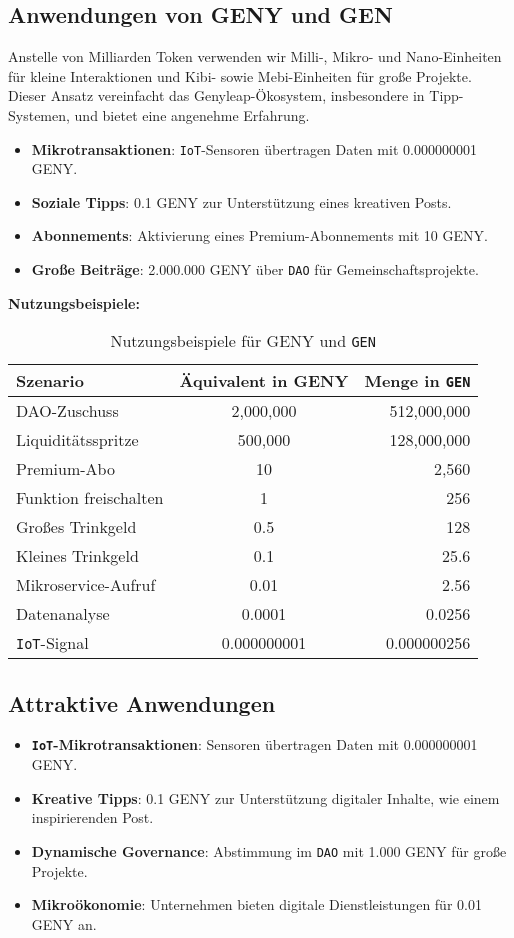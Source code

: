 \documentclass[a4paper,12pt,openany]{book}
\begin{document}
\subsection*{Anwendungen von GENY und GEN}
Anstelle von Milliarden Token verwenden wir Milli-, Mikro- und Nano-Einheiten für kleine Interaktionen und Kibi- sowie Mebi-Einheiten für große Projekte. Dieser Ansatz vereinfacht das Genyleap-Ökosystem, insbesondere in Tipp-Systemen, und bietet eine angenehme Erfahrung.
\begin{itemize}
    \item \textbf{Mikrotransaktionen}: \texttt{IoT}-Sensoren übertragen Daten mit 0.000000001 GENY.
    \item \textbf{Soziale Tipps}: 0.1 GENY zur Unterstützung eines kreativen Posts.
    \item \textbf{Abonnements}: Aktivierung eines Premium-Abonnements mit 10 GENY.
    \item \textbf{Große Beiträge}: 2.000.000 GENY über \texttt{DAO} für Gemeinschaftsprojekte.
\end{itemize}

\textbf{Nutzungsbeispiele:}
\begin{table}[h]
\centering
\caption{Nutzungsbeispiele für GENY und \texttt{GEN}}
\small
\begin{tabular}{l c r}
\hline
\textbf{Szenario} & \textbf{Äquivalent in GENY} & \textbf{Menge in \texttt{GEN}} \\
\hline
DAO-Zuschuss & 2,000,000 & 512,000,000 \\
Liquiditätsspritze & 500,000 & 128,000,000 \\
Premium-Abo & 10 & 2,560 \\
Funktion freischalten & 1 & 256 \\
Großes Trinkgeld & 0.5 & 128 \\
Kleines Trinkgeld & 0.1 & 25.6 \\
Mikroservice-Aufruf & 0.01 & 2.56 \\
Datenanalyse & 0.0001 & 0.0256 \\
\texttt{IoT}-Signal & 0.000000001 & 0.000000256 \\
\hline
\end{tabular}
\end{table}

\subsection*{Attraktive Anwendungen}
\begin{itemize}
    \item \textbf{\texttt{IoT}-Mikrotransaktionen}: Sensoren übertragen Daten mit 0.000000001 GENY.
    \item \textbf{Kreative Tipps}: 0.1 GENY zur Unterstützung digitaler Inhalte, wie einem inspirierenden Post.
    \item \textbf{Dynamische Governance}: Abstimmung im \texttt{DAO} mit 1.000 GENY für große Projekte.
    \item \textbf{Mikroökonomie}: Unternehmen bieten digitale Dienstleistungen für 0.01 GENY an.
\end{itemize}
\end{document}
